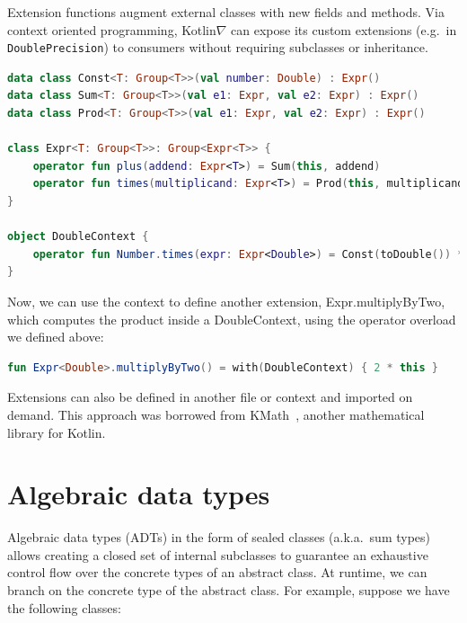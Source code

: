 \documentclass[12pt,initial,twoside,maitrise]{dms}
\numberwithin{equation}{section}
\numberwithin{table}{chapter}
\numberwithin{figure}{chapter}
\begin{document}
Extension functions augment external classes with new fields and methods. Via context oriented programming, Kotlin$\nabla$ can expose its custom extensions (e.g.\ in \texttt{DoublePrecision}) to consumers without requiring subclasses or inheritance.

\begin{lstlisting}[caption={Using extension functions we can provide numerical conversions for common data types, wrapped by a Context.}, language=Kotlin]
data class Const<T: Group<T>>(val number: Double) : Expr()
data class Sum<T: Group<T>>(val e1: Expr, val e2: Expr) : Expr()
data class Prod<T: Group<T>>(val e1: Expr, val e2: Expr) : Expr()

class Expr<T: Group<T>>: Group<Expr<T>> {
    operator fun plus(addend: Expr<T>) = Sum(this, addend)
    operator fun times(multiplicand: Expr<T>) = Prod(this, multiplicand)
}

object DoubleContext {
    operator fun Number.times(expr: Expr<Double>) = Const(toDouble()) * expr
}
\end{lstlisting}

Now, we can use the context to define another extension, Expr.multiplyByTwo, which computes the product inside a DoubleContext, using the operator overload we defined above:

\begin{lstlisting}[caption={Simple code listing.}, language=Kotlin]
fun Expr<Double>.multiplyByTwo() = with(DoubleContext) { 2 * this }
\end{lstlisting}

Extensions can also be defined in another file or context and imported on demand. This approach was borrowed from KMath~\cite{nozik2019acat}, another mathematical library for Kotlin.

\section{Algebraic data types}\label{sec:adts}

Algebraic data types (ADTs) in the form of sealed classes (a.k.a.\ sum types) allows creating a closed set of internal subclasses to guarantee an exhaustive control flow over the concrete types of an abstract class. At runtime, we can branch on the concrete type of the abstract class. For example, suppose we have the following classes:
\end{document}
